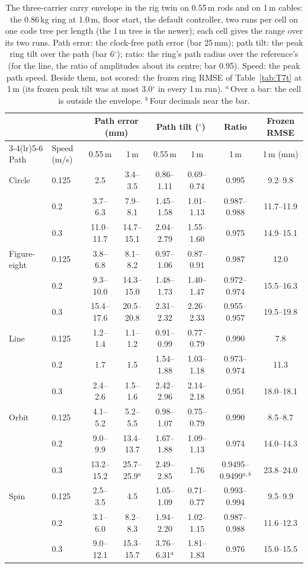 \begin{table}[htbp]
\centering
\footnotesize
\setlength{\tabcolsep}{2.6pt}
\caption[The carry envelope on 1\,m cables]{The three-carrier carry envelope in the rig twin on 0.55\,m rods and on
1\,m cables: the 0.86\,kg ring at 1.0\,m, floor start, the default controller, two runs per cell on one code tree per
length (the 1\,m tree is the newer); each cell gives the range over its two runs. Path error: the clock-free path
error (bar 25\,mm); path tilt: the peak ring tilt over the path (bar 6$^\circ$); ratio: the ring's path radius over the
reference's (for the line, the ratio of amplitudes about its centre; bar 0.95). Speed: the peak path speed. Beside
them, not scored: the frozen ring RMSE of Table~\ref{tab:T7t} at 1\,m (its frozen peak tilt was at most 3.0$^\circ$ in
every 1\,m run). $^a$\,Over a bar: the cell is
outside the envelope. $^b$\,Four decimals near the bar.}
\label{tab:refly_T7t}
\begin{tabular}{llcccccc}
\toprule
 & & \multicolumn{2}{c}{Path error (mm)} & \multicolumn{2}{c}{Path tilt ($^\circ$)} & Ratio & Frozen RMSE \\
\cmidrule(lr){3-4}\cmidrule(lr){5-6}
Path & Speed (m/s) & 0.55\,m & 1\,m & 0.55\,m & 1\,m & 1\,m & 1\,m (mm) \\
\midrule
Circle & 0.125 & 2.5 & 3.4--3.5 & 0.86--1.11 & 0.69--0.74 & 0.995 & 9.2--9.8 \\
 & 0.2 & 3.7--6.3 & 7.9--8.1 & 1.45--1.58 & 1.01--1.13 & 0.987--0.988 & 11.7--11.9 \\
 & 0.3 & 11.0--11.7 & 14.7--15.1 & 2.04--2.79 & 1.55--1.60 & 0.975 & 14.9--15.1 \\
\addlinespace
Figure-eight & 0.125 & 3.8--6.8 & 8.1--8.2 & 0.97--1.06 & 0.87--0.91 & 0.987 & 12.0 \\
 & 0.2 & 9.3--10.0 & 14.3--15.0 & 1.48--1.73 & 1.40--1.47 & 0.972--0.974 & 15.5--16.3 \\
 & 0.3 & 15.4--17.6 & 20.5--20.8 & 2.31--2.32 & 2.26--2.33 & 0.955--0.957 & 19.5--19.8 \\
\addlinespace
Line & 0.125 & 1.2--1.4 & 1.1--1.2 & 0.91--0.99 & 0.77--0.79 & 0.990 & 7.8 \\
 & 0.2 & 1.7 & 1.5 & 1.54--1.88 & 1.03--1.18 & 0.973--0.974 & 11.3 \\
 & 0.3 & 2.4--2.6 & 1.5--1.6 & 2.42--2.96 & 2.14--2.18 & 0.951 & 18.0--18.1 \\
\addlinespace
Orbit & 0.125 & 4.1--5.2 & 5.2--5.5 & 0.98--1.07 & 0.75--0.79 & 0.990 & 8.5--8.7 \\
 & 0.2 & 9.0--9.9 & 13.4--13.7 & 1.67--1.88 & 1.09--1.13 & 0.974 & 14.0--14.3 \\
 & 0.3 & 13.2--15.2 & 25.7--25.9$^a$ & 2.49--2.85 & 1.76 & 0.9495--0.9499$^{a,b}$ & 23.8--24.0 \\
\addlinespace
Spin & 0.125 & 2.5--3.5 & 4.5 & 1.05--1.09 & 0.71--0.77 & 0.993--0.994 & 9.5--9.9 \\
 & 0.2 & 3.1--6.0 & 8.2--8.3 & 1.94--2.20 & 1.02--1.15 & 0.987--0.988 & 11.6--12.3 \\
 & 0.3 & 9.0--12.1 & 15.3--15.7 & 3.76--6.31$^a$ & 1.81--1.83 & 0.976 & 15.0--15.5 \\
\bottomrule
\end{tabular}
\end{table}
